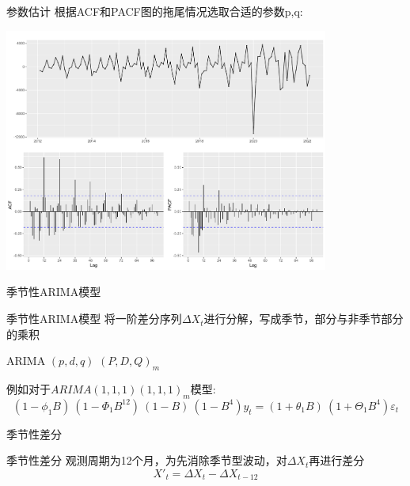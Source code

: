 \documentclass[10pt]{beamer}
\begin{document}
\begin{frame}{参数估计}
  根据ACF和PACF图的拖尾情况选取合适的参数p,q:
  \begin{center}
    \includegraphics[width=0.8\textwidth]{figures/acf_pacf.pdf}
  \end{center}   
\end{frame}
\begin{frame}{季节性ARIMA模型}
  \begin{block}{季节性ARIMA模型}
    将一阶差分序列\(\Delta X_t\)进行分解，写成季节，部分与非季节部分的乘积

    \begin{center}
      ARIMA\;\;\;\;	\((p, d, q)\)	\;\;\;\;\; \((P, D, Q)_{m}\) \label{Season_decompose}
    \end{center}
    
    例如对于\(ARIMA(1,1,1)(1,1,1)_m\)模型:
    \[(1 - \phi_{1}B)~(1 - \Phi_{1}B^{12})~(1 - B)~(1 - B^{4})y_{t} = (1 + \theta_{1}B)~ (1 + \Theta_{1}B^{4})\varepsilon_{t}\]
  \end{block}
\end{frame}

\begin{frame}{季节性差分}
  \begin{block}{季节性差分}
    观测周期为12个月，为先消除季节型波动，对\(\Delta X_t\)再进行差分
    \[X'_{t} = \Delta X_t-\Delta X_{t-12}\]
  \end{block}
\end{frame}
\end{document}
